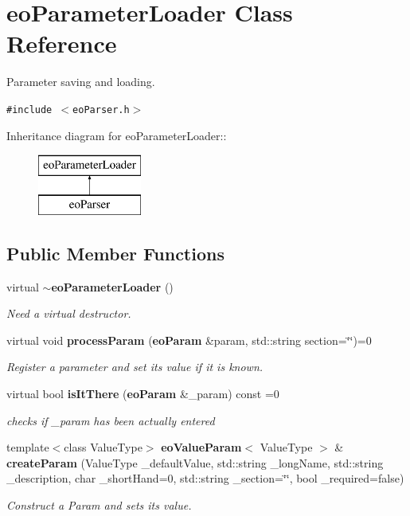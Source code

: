 \section{eo\-Parameter\-Loader Class Reference}
\label{classeo_parameter_loader}
Parameter saving and loading.  


{\tt \#include $<$eo\-Parser.h$>$}

Inheritance diagram for eo\-Parameter\-Loader::\begin{figure}[H]
\begin{center}
\leavevmode
\includegraphics[height=2cm]{classeo_parameter_loader}
\end{center}
\end{figure}
\subsection*{Public Member Functions}
\begin{CompactItemize}
\item 
virtual {\bf $\sim$eo\-Parameter\-Loader} ()\label{classeo_parameter_loader_a0}

\begin{CompactList}\small\item\em Need a virtual destructor. \item\end{CompactList}\item 
virtual void {\bf process\-Param} ({\bf eo\-Param} \&param, std::string section=\char`\"{}\char`\"{})=0
\begin{CompactList}\small\item\em Register a parameter and set its value if it is known. \item\end{CompactList}\item 
virtual bool {\bf is\-It\-There} ({\bf eo\-Param} \&\_\-param) const =0\label{classeo_parameter_loader_a2}

\begin{CompactList}\small\item\em checks if \_\-param has been actually entered \item\end{CompactList}\item 
template$<$class Value\-Type$>$ {\bf eo\-Value\-Param}$<$ Value\-Type $>$ \& {\bf create\-Param} (Value\-Type \_\-default\-Value, std::string \_\-long\-Name, std::string \_\-description, char \_\-short\-Hand=0, std::string \_\-section=\char`\"{}\char`\"{}, bool \_\-required=false)
\begin{CompactList}\small\item\em Construct a Param and sets its value. \item\end{CompactList}\end{CompactItemize}
